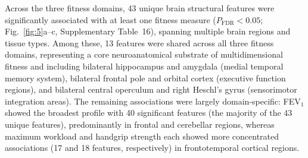 \documentclass{article}
\begin{document}
Across the three fitness domains, 43 unique brain structural features were 
significantly associated with at least one fitness measure 
($P_{\text{FDR}} < 0.05$; Fig.~\ref{fig:5}a--c, Supplementary Table~16), 
spanning multiple brain regions and tissue types.
Among these, 13 features were shared across all three fitness domains, 
representing a core neuroanatomical substrate of multidimensional fitness 
and including bilateral hippocampus and amygdala (medial temporal memory 
system), bilateral frontal pole and orbital cortex (executive function 
regions), and bilateral central operculum and right Heschl's gyrus 
(sensorimotor integration areas).
The remaining associations were largely domain-specific: FEV$_1$ showed the 
broadest profile with 40 significant features (the majority of the 43 
unique features), predominantly in frontal and cerebellar regions, whereas 
maximum workload and handgrip strength each showed more concentrated 
associations (17 and 18 features, respectively) in frontotemporal cortical 
regions.
\end{document}
